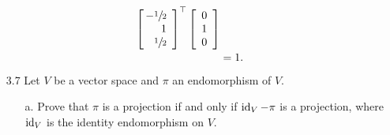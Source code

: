 \documentclass[11pt]{article}
\begin{document}
\begin{enumerate}
\[\begin{aligned}
{\begin{bmatrix}
                          \begin{array}{@{\,}r}
                              -\sfrac{1}{2} \\ 1 \\ \sfrac{1}{2}
                          \end{array}
                      \end{bmatrix}^\top
                      \begin{bmatrix}
                          \begin{array}{c}
                              0 \\ 1 \\ 0
                          \end{array}
                      \end{bmatrix}
                  }
                  \\
                                   & = 1.
              \end{aligned}
          \]

          \vspace{1em}

          \pagebreak

    \item[3.7] Let $V$ be a vector space and $\pi$ an endomorphism of $V$.

          \begin{enumerate}
              \item[a.] Prove that $\pi$ is a projection if and only if $\operatorname{id}_V - \pi$ is a projection, where $\operatorname{id}_V$
                    is the identity endomorphism on $V$.


\end{enumerate}
\end{enumerate}
\end{document}
